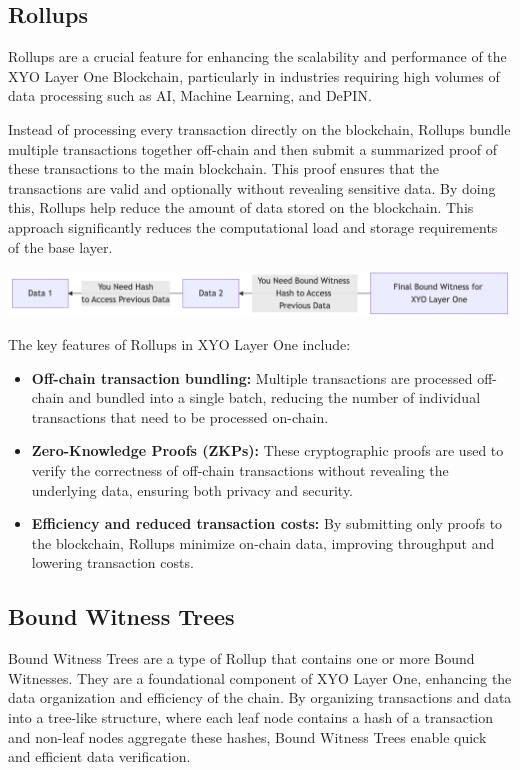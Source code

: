 \documentclass{article}
\begin{document}
\subsection{Rollups}
Rollups are a crucial feature for enhancing the scalability and performance of
the XYO Layer One Blockchain, particularly in industries requiring high volumes
of data processing such as AI, Machine Learning, and DePIN.

Instead of processing every transaction directly on the blockchain, Rollups
bundle multiple transactions together off-chain and then submit a summarized
proof of these transactions to the main blockchain. This proof ensures that the
transactions are valid and optionally without revealing sensitive data. By
doing this, Rollups help reduce the amount of data stored on the blockchain.
This approach significantly reduces the computational load and storage
requirements of the base layer.

\begin{center}
    \includegraphics[width=15cm]{rollup.png}
\end{center}

The key features of Rollups in XYO Layer One include:
\begin{itemize}
    \item \textbf{Off-chain transaction bundling:} Multiple transactions are processed off-chain and bundled into a single batch, reducing the number of individual transactions that need to be processed on-chain.
    \item \textbf{Zero-Knowledge Proofs (ZKPs):} These cryptographic proofs are used to verify the correctness of off-chain transactions without revealing the underlying data, ensuring both privacy and security.
    \item \textbf{Efficiency and reduced transaction costs:} By submitting only proofs to the blockchain, Rollups minimize on-chain data, improving throughput and lowering transaction costs.
\end{itemize}

\subsection{Bound Witness Trees}
Bound Witness Trees are a type of Rollup that contains one or more Bound
Witnesses. They are a foundational component of XYO Layer One, enhancing the
data organization and efficiency of the chain. By organizing transactions and
data into a tree-like structure, where each leaf node contains a hash of a
transaction and non-leaf nodes aggregate these hashes, Bound Witness Trees
enable quick and efficient data verification.
\end{document}
